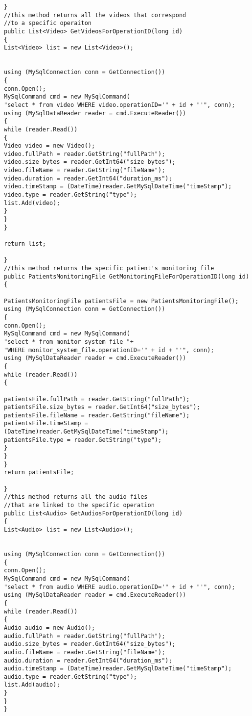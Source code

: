 \begin{lstlisting}
}
//this method returns all the videos that correspond
//to a specific operaiton
public List<Video> GetVideosForOperationID(long id)
{
List<Video> list = new List<Video>();


using (MySqlConnection conn = GetConnection())
{
conn.Open();
MySqlCommand cmd = new MySqlCommand(
"select * from video WHERE video.operationID='" + id + "'", conn);
using (MySqlDataReader reader = cmd.ExecuteReader())
{
while (reader.Read())
{
Video video = new Video();
video.fullPath = reader.GetString("fullPath");
video.size_bytes = reader.GetInt64("size_bytes");
video.fileName = reader.GetString("fileName");
video.duration = reader.GetInt64("duration_ms");
video.timeStamp = (DateTime)reader.GetMySqlDateTime("timeStamp");
video.type = reader.GetString("type");
list.Add(video);
}
}
}

return list;

}
//this method returns the specific patient's monitoring file
public PatientsMonitoringFile GetMonitoringFileForOperationID(long id)
{

PatientsMonitoringFile patientsFile = new PatientsMonitoringFile();
using (MySqlConnection conn = GetConnection())
{
conn.Open();
MySqlCommand cmd = new MySqlCommand(
"select * from monitor_system_file "+
"WHERE monitor_system_file.operationID='" + id + "'", conn);
using (MySqlDataReader reader = cmd.ExecuteReader())
{
while (reader.Read())
{

patientsFile.fullPath = reader.GetString("fullPath");
patientsFile.size_bytes = reader.GetInt64("size_bytes");
patientsFile.fileName = reader.GetString("fileName");
patientsFile.timeStamp = (DateTime)reader.GetMySqlDateTime("timeStamp");
patientsFile.type = reader.GetString("type");
}
}
}
return patientsFile;

}
//this method returns all the audio files
//that are linked to the specific operation
public List<Audio> GetAudiosForOperationID(long id)
{
List<Audio> list = new List<Audio>();


using (MySqlConnection conn = GetConnection())
{
conn.Open();
MySqlCommand cmd = new MySqlCommand(
"select * from audio WHERE audio.operationID='" + id + "'", conn);
using (MySqlDataReader reader = cmd.ExecuteReader())
{
while (reader.Read())
{
Audio audio = new Audio();
audio.fullPath = reader.GetString("fullPath");
audio.size_bytes = reader.GetInt64("size_bytes");
audio.fileName = reader.GetString("fileName");
audio.duration = reader.GetInt64("duration_ms");
audio.timeStamp = (DateTime)reader.GetMySqlDateTime("timeStamp");
audio.type = reader.GetString("type");
list.Add(audio);
}
}
}


\end{lstlisting}
